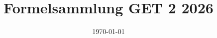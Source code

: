 \documentclass[a4paper,12pt]{scrartcl}
\title{Formelsammlung GET 2 2026}
\date{\today}
\begin{document}
\begin{center}
\maketitle

\end{center}

\section*{}

\pagestyle{fancy}

\rhead{\leftmark}
\lhead{\rightmark}

\cfoot{\thepage}

\renewcommand{\headrulewidth}{0.4pt}
\renewcommand{\footrulewidth}{0.4pt}

\begin{tabular}{@{} >{\raggedright\arraybackslash}p{7cm} >{\raggedleft\arraybackslash}p{9cm} @{}}

\end{tabular}
\end{document}

